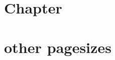 \documentclass{book}
\newcommand{\Texinfothechapterheading}{}
\newcommand{\Texinfoheadingchaptername}{\chaptername}
\newcommand{\Texinfochapter}[1]{\chapter{#1}
\renewcommand{\Texinfothechapterheading}{\Texinfoheadingchaptername{} \thechapter{} }%
}%
\renewcommand{\_}{\Texinfounderscore\discretionary{}{}{}}
\begin{document}
\label{anchor:Top}%
\Texinfochapter{{Chapter}}
\label{anchor:chapter}%


\Texinfochapter{{other pagesizes}}
\label{anchor:other-pagesizes}%

\end{document}
